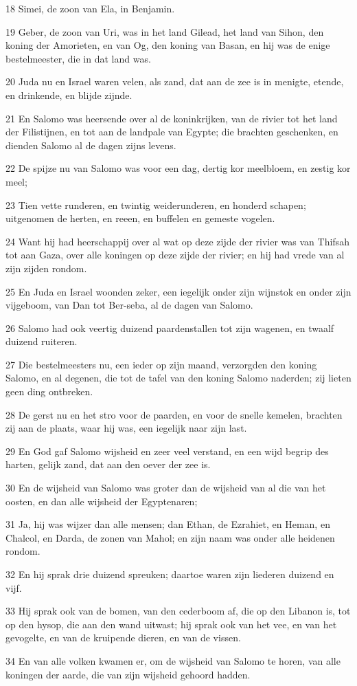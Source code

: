 \par 18 Simei, de zoon van Ela, in Benjamin.
\par 19 Geber, de zoon van Uri, was in het land Gilead, het land van Sihon, den koning der Amorieten, en van Og, den koning van Basan, en hij was de enige bestelmeester, die in dat land was.
\par 20 Juda nu en Israel waren velen, als zand, dat aan de zee is in menigte, etende, en drinkende, en blijde zijnde.
\par 21 En Salomo was heersende over al de koninkrijken, van de rivier tot het land der Filistijnen, en tot aan de landpale van Egypte; die brachten geschenken, en dienden Salomo al de dagen zijns levens.
\par 22 De spijze nu van Salomo was voor een dag, dertig kor meelbloem, en zestig kor meel;
\par 23 Tien vette runderen, en twintig weiderunderen, en honderd schapen; uitgenomen de herten, en reeen, en buffelen en gemeste vogelen.
\par 24 Want hij had heerschappij over al wat op deze zijde der rivier was van Thifsah tot aan Gaza, over alle koningen op deze zijde der rivier; en hij had vrede van al zijn zijden rondom.
\par 25 En Juda en Israel woonden zeker, een iegelijk onder zijn wijnstok en onder zijn vijgeboom, van Dan tot Ber-seba, al de dagen van Salomo.
\par 26 Salomo had ook veertig duizend paardenstallen tot zijn wagenen, en twaalf duizend ruiteren.
\par 27 Die bestelmeesters nu, een ieder op zijn maand, verzorgden den koning Salomo, en al degenen, die tot de tafel van den koning Salomo naderden; zij lieten geen ding ontbreken.
\par 28 De gerst nu en het stro voor de paarden, en voor de snelle kemelen, brachten zij aan de plaats, waar hij was, een iegelijk naar zijn last.
\par 29 En God gaf Salomo wijsheid en zeer veel verstand, en een wijd begrip des harten, gelijk zand, dat aan den oever der zee is.
\par 30 En de wijsheid van Salomo was groter dan de wijsheid van al die van het oosten, en dan alle wijsheid der Egyptenaren;
\par 31 Ja, hij was wijzer dan alle mensen; dan Ethan, de Ezrahiet, en Heman, en Chalcol, en Darda, de zonen van Mahol; en zijn naam was onder alle heidenen rondom.
\par 32 En hij sprak drie duizend spreuken; daartoe waren zijn liederen duizend en vijf.
\par 33 Hij sprak ook van de bomen, van den cederboom af, die op den Libanon is, tot op den hysop, die aan den wand uitwast; hij sprak ook van het vee, en van het gevogelte, en van de kruipende dieren, en van de vissen.
\par 34 En van alle volken kwamen er, om de wijsheid van Salomo te horen, van alle koningen der aarde, die van zijn wijsheid gehoord hadden.


